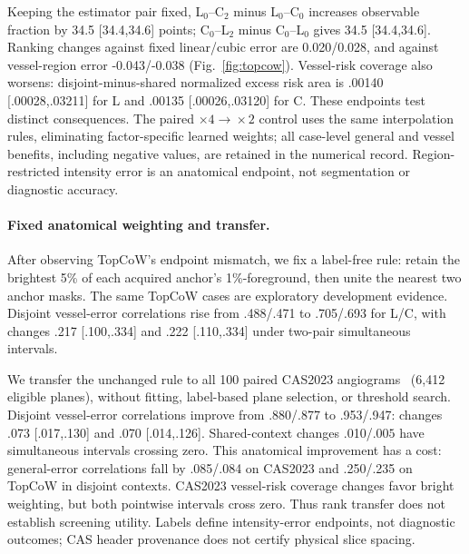 \documentclass[journal,10pt]{IEEEtran}
\begin{document}
Keeping the estimator pair fixed, L$_0$--C$_2$ minus L$_0$--C$_0$ increases observable fraction by 34.5 [34.4,34.6] points; C$_0$--L$_2$ minus C$_0$--L$_0$ gives 34.5 [34.4,34.6]. Ranking changes against fixed linear/cubic error are 0.020/0.028, and against vessel-region error -0.043/-0.038 (Fig.~\ref{fig:topcow}). Vessel-risk coverage also worsens: disjoint-minus-shared normalized excess risk area is .00140 [.00028,.03211] for L and .00135 [.00026,.03120] for C. These endpoints test distinct consequences. The paired $\times4\!\rightarrow\!\times2$ control uses the same interpolation rules, eliminating factor-specific learned weights; all case-level general and vessel benefits, including negative values, are retained in the numerical record. Region-restricted intensity error is an anatomical endpoint, not segmentation or diagnostic accuracy.

\paragraph{Fixed anatomical weighting and transfer.}
After observing TopCoW's endpoint mismatch, we fix a label-free rule: retain the brightest 5\% of each acquired anchor's 1\%-foreground, then unite the nearest two anchor masks. The same TopCoW cases are exploratory development evidence. Disjoint vessel-error correlations rise from .488/.471 to .705/.693 for L/C, with changes .217 [.100,.334] and .222 [.110,.334] under two-pair simultaneous intervals.

We transfer the unchanged rule to all 100 paired CAS2023 angiograms~\cite{cas2023} (6,412 eligible planes), without fitting, label-based plane selection, or threshold search. Disjoint vessel-error correlations improve from .880/.877 to .953/.947: changes .073 [.017,.130] and .070 [.014,.126]. Shared-context changes .010/$ .005$ have simultaneous intervals crossing zero. This anatomical improvement has a cost: general-error correlations fall by .085/.084 on CAS2023 and .250/.235 on TopCoW in disjoint contexts. CAS2023 vessel-risk coverage changes favor bright weighting, but both pointwise intervals cross zero. Thus rank transfer does not establish screening utility. Labels define intensity-error endpoints, not diagnostic outcomes; CAS header provenance does not certify physical slice spacing.
\end{document}
